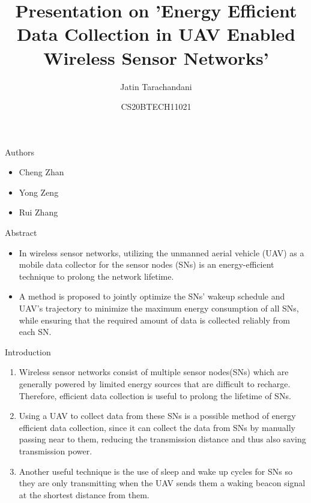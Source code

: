 \documentclass{beamer}
\title{Presentation on 'Energy Efficient Data Collection in UAV Enabled Wireless Sensor Networks'}
\author{Jatin Tarachandani}
\date{CS20BTECH11021}
\begin{document}
\begin{frame}
\titlepage
\end{frame}
\begin{frame}{}
\begin{block}{Authors}
\begin{itemize}
    \item Cheng Zhan
    \item Yong Zeng
    \item Rui Zhang
\end{itemize}

\end{block}
\begin{block}{Abstract}
\begin{itemize}
\item In wireless sensor networks, utilizing the unmanned
aerial vehicle (UAV) as a mobile data collector for the sensor
nodes (SNs) is an energy-efficient technique to prolong the network lifetime.
\item A method is proposed to jointly optimize the SNs’ wakeup schedule and UAV’s trajectory to minimize the maximum
energy consumption of all SNs, while ensuring that the required
amount of data is collected reliably from each SN.
\end{itemize}
\end{block}
\end{frame}
\begin{frame}{Introduction}
\begin{enumerate}
   \item Wireless sensor networks consist of multiple sensor nodes(SNs) which are generally powered by limited energy sources that are difficult to recharge. Therefore, efficient data collection is useful to prolong the lifetime of SNs. 
   \item Using a UAV to collect data from these SNs is a possible method of energy efficient data collection, since it can collect the data from SNs by manually passing near to them, reducing the transmission distance and thus also saving transmission power.
   \item Another useful technique is the use of sleep and wake up cycles for SNs so they are only transmitting when the UAV sends them a waking beacon signal at the shortest distance from them.
   \end{enumerate}
\end{frame}
\end{document}
